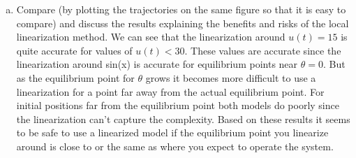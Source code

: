\documentclass{article}
\begin{document}
\begin{enumerate}[a)]
\item Compare (by plotting the trajectories on the same figure so that it is easy to compare) and discuss the results explaining the benefits and risks of the local linearization method.
\newline
We can see that the linearization around $u(t) = 15$ is quite accurate for values of $u(t) < 30$.
These values are accurate since the linearization around sin(x) is accurate for equilibrium points near $\theta = 0$.
But as the equilibrium point for $\theta$ grows it becomes more difficult to use a linearization for a point far away from the actual equilibrium point.
For initial positions far from the equilibrium point both models do poorly since the linearization can't capture the complexity.
\newline
Based on these results it seems to be safe to use a linearized model if the equilibrium point you linearize around is close to or the same as where you expect to operate the system.


\end{enumerate}
\end{document}
